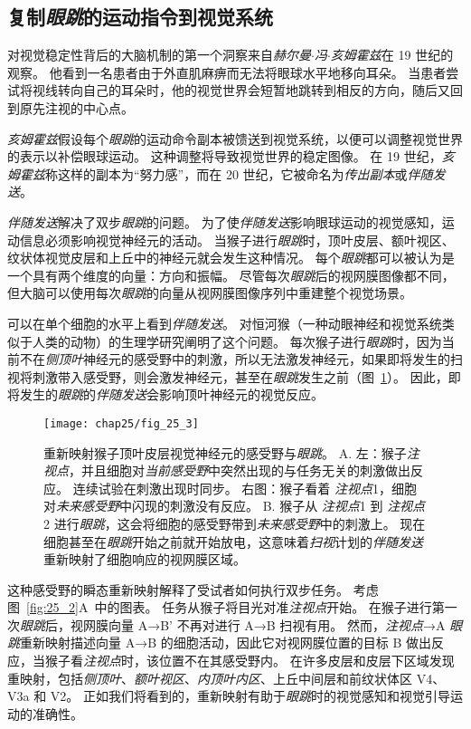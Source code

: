 \subsection{复制\textit{眼跳}的运动指令到视觉系统}

对视觉稳定性背后的大脑机制的第一个洞察来自\textit{赫尔曼$\cdot$冯$\cdot$亥姆霍兹}在 19 世纪的观察。
他看到一名患者由于外直肌麻痹而无法将眼球水平地移向耳朵。
当患者尝试将视线转向自己的耳朵时，他的视觉世界会短暂地跳转到相反的方向，随后又回到原先注视的中心点。


\textit{亥姆霍兹}假设每个\textit{眼跳}的运动命令副本被馈送到视觉系统，以便可以调整视觉世界的表示以补偿眼球运动。
这种调整将导致视觉世界的稳定图像。
在 19 世纪，\textit{亥姆霍兹}称这样的副本为“努力感”，而在 20 世纪，它被命名为\textit{传出副本}或\textit{伴随发送}。


\textit{伴随发送}解决了双步\textit{眼跳}的问题。
为了使\textit{伴随发送}影响眼球运动的视觉感知，运动信息必须影响视觉神经元的活动。
当猴子进行\textit{眼跳}时，顶叶皮层、额叶视区、纹状体视觉皮层和上丘中的神经元就会发生这种情况。
每个\textit{眼跳}都可以被认为是一个具有两个维度的向量：方向和振幅。
尽管每次\textit{眼跳}后的视网膜图像都不同，但大脑可以使用每次\textit{眼跳}的向量从视网膜图像序列中重建整个视觉场景。


可以在单个细胞的水平上看到\textit{伴随发送}。
对恒河猴（一种动眼神经和视觉系统类似于人类的动物）的生理学研究阐明了这个问题。
每次猴子进行\textit{眼跳}时，因为当前不在\textit{侧顶叶}神经元的感受野中的刺激，所以无法激发神经元，如果即将发生的扫视将刺激带入感受野，则会激发神经元，甚至在\textit{眼跳}发生之前（图~\ref{fig:25_3}）。
因此，即将发生的\textit{眼跳}的\textit{伴随发送}会影响顶叶神经元的视觉反应。


\begin{figure}[htbp]
	\centering
	\texttt{[image: chap25/fig\_25\_3]}
	\caption{重新映射猴子顶叶皮层视觉神经元的感受野与\textit{眼跳}\cite{duhamel1992updating}。
		A. 左：猴子\textit{注视点}，并且细胞对\textit{当前感受野}中突然出现的与任务无关的刺激做出反应。
		连续试验在刺激出现时同步。
		右图：猴子看着 \textit{注视点}1，细胞对\textit{未来感受野}中闪现的刺激没有反应。
		B. 猴子从 \textit{注视点}1 到 \textit{注视点}2 进行\textit{眼跳}，这会将细胞的感受野带到\textit{未来感受野}中的刺激上。
		现在细胞甚至在\textit{眼跳}开始之前就开始放电，这意味着\textit{扫视}计划的\textit{伴随发送}重新映射了细胞响应的视网膜区域。}
	\label{fig:25_3}
\end{figure}


这种感受野的瞬态重新映射解释了受试者如何执行双步任务。
考虑图~\ref{fig:25_2}A~中的图表。
任务从猴子将目光对准\textit{注视点}开始。
在猴子进行第一次\textit{眼跳}后，视网膜向量 A→B' 不再对进行 A→B 扫视有用。
然而，\textit{注视点}→A \textit{眼跳}重新映射描述向量 A→B 的细胞活动，因此它对视网膜位置的目标 B 做出反应，当猴子看\textit{注视点}时，该位置不在其感受野内。
在许多皮层和皮层下区域发现重映射，包括\textit{侧顶叶}、\textit{额叶视区}、\textit{内顶叶内区}、上丘中间层和前纹状体区 V4、V3a 和 V2。
正如我们将看到的，重新映射有助于\textit{眼跳}时的视觉感知和视觉引导运动的准确性。


